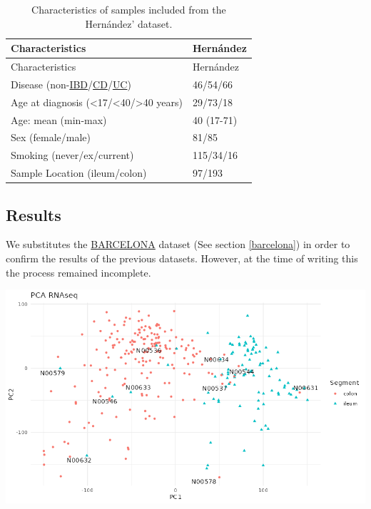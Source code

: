 \documentclass[
  12pt,
  a4paper,
  twoside,
  openright]{book}
\let\origfigure\figure
\let\endorigfigure\endfigure
\renewenvironment{figure}[1][2] {
    \expandafter\origfigure\expandafter[!htbp]
} {
    \endorigfigure
}
\begin{document}
\begin{longtable}[]{@{}ll@{}}
\caption{\label{tab:hernandez} Characteristics of samples included from the Hernández' dataset.}\tabularnewline
\toprule
Characteristics & Hernández \\
\midrule
\endfirsthead
\toprule
Characteristics & Hernández \\
\midrule
\endhead
Disease (non-\protect\hyperlink{acronyms_IBD}{IBD}/\protect\hyperlink{acronyms_CD}{CD}/\protect\hyperlink{acronyms_UC}{UC}) & 46/54/66 \\
Age at diagnosis (\textless17/\textless40/\textgreater40 years) & 29/73/18 \\
Age: mean (min-max) & 40 (17-71) \\
Sex (female/male) & 81/85 \\
Smoking (never/ex/current) & 115/34/16 \\
Sample Location (ileum/colon) & 97/193 \\
\bottomrule
\end{longtable}

\hypertarget{results-hernandez}{%
\subsection{Results}\label{results-hernandez}}

We substitutes the \protect\hyperlink{acronyms_BARCELONA}{BARCELONA} dataset (See section \ref{barcelona}) in order to confirm the results of the previous datasets.
However, at the time of writing this the process remained incomplete.

\begin{figure}
\includegraphics[width=1\linewidth]{images/hernandez_PCA_RNAseq} \caption[PCA of RNAseq of the Hernandez's dataset]{PCA of RNAseq of the Hernandez's dataset. The plot shows a clear separation between colon and ileum for most samples except for some that seem mislabeled.}\label{fig:unnamed-chunk-5}
\end{figure}
\end{document}

